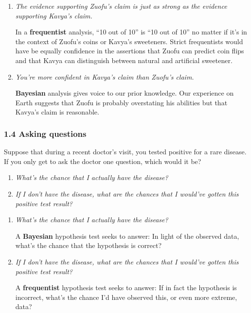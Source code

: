 \documentclass{beamer}
\begin{document}
\begin{frame}
    \begin{enumerate}
        \setlength\parskip{1em}
        \setlength\itemsep{1em}
        \item \textit{The evidence supporting Zuofu's claim is just as strong as the evidence
        supporting Kavya's claim.}
            
        In a \textbf{frequentist} analysis, ``10 out of 10'' is
        ``10 out of 10'' no matter if it's in the context of Zuofu's coins or
        Kavya's sweeteners. Strict frequentists would have be equally confidence
        in the assertions that Zuofu can predict coin flips and that Kavya can
        distinguish between natural and artificial sweetener.

        \item \textit{You're more confident in Kavya's claim than Zuofu's claim.}
        
        \textbf{Bayesian} analysis gives voice to our prior knowledge.
        Our experience on Earth suggests that Zuofu is probably overstating
        his abilities but that Kavya's claim is reasonable.
    \end{enumerate}
\end{frame}

\begin{frame}
    \setlength\parskip{1em}
    \frametitle{1.4 Asking questions}


    Suppose that during a recent doctor's visit, you tested positive for a
    rare disease. If you only get to ask the doctor one question, which
    would it be?

    \begin{enumerate}
        \setlength\itemsep{1em}
        \item \textit{What's the chance that I actually have the disease?}
        \item \textit{If I don't have the disease, what are the chances that I would've gotten this positive test result?}
    \end{enumerate}
\end{frame}

\begin{frame}
    \begin{enumerate}
        \setlength\parskip{1em}
        \setlength\itemsep{1em}
        \item \textit{What's the chance that I actually have the disease?}
            
        A \textbf{Bayesian} hypothesis test seeks to answer:
        In light of the observed data, what's the chance that the hypothesis is correct?


        \item \textit{If I don't have the disease, what are the chances that I would've gotten this positive test result?}
        
        A \textbf{frequentist} hypothesis test seeks to answer:
        If in fact the hypothesis is incorrect, what's the chance I'd have observed this, or even more extreme, data?
    \end{enumerate}
\end{frame}
\end{document}
